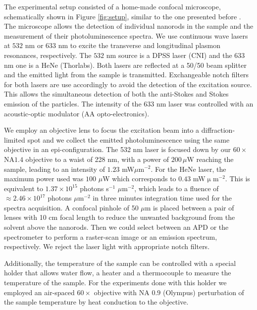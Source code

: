 \documentclass[journal=nalefd,manuscript=letter]{achemso}
\begin{document}
The experimental setup consisted of a home-made confocal microscope, schematically shown in Figure
\ref{fig:setup}, similar to the one presented before \cite{Carattino2016a}. The microscope allows 
the detection of individual nanorods in the sample and the measurement 
of their photoluminescence spectra. 
We use continuous wave lasers at $532$ nm or $633$ nm to excite the transverse 
and longitudinal plasmon resonances, respectively. The  $532$ nm source is a DPSS 
laser (CNI) and the 633 nm one is a HeNe (Thorlabs). Both lasers are reflected at
 a 50/50 beam splitter and the emitted light from the sample is transmitted. 
Exchangeable notch filters for both lasers are use accordingly to avoid the detection 
of the excitation source. This allows the simultaneous detection of both the anti-Stokes
 and Stokes emission of the particles. The intensity of the $633$ nm laser was 
controlled with an acoustic-optic modulator (AA opto-electronics).

We employ an objective lens to focus the excitation beam into a diffraction-limited 
spot and we collect the emitted photoluminescence using the same objective in an epi-configuration. 
The 532 nm laser is focused down by our $60\times$ NA$1.4$ objective to a waist of 228 nm, 
with a power of $200\, \mu$W reaching the sample, leading to an intensity of $1.23$ mW$\mu$m$^{-2}$. 
For the HeNe laser, the maximum power used was $100$ $\mu$W which 
corresponds to $0.43$ mW$\upmu$m$^{-2}$. This is equivalent to $1.37\times10^{15}$ 
photons s$^{-1}$ $\mu$m$^{-2}$, which leads to a fluence of $\approx 2.46\times10^{17}$ photons $\mu$m$^{-2}$ 
in three minutes integration time used for the spectra acquisition. 
A confocal pinhole of 50 $\mu$m is placed between a pair of lenses with 10 cm focal length 
to reduce the unwanted background from the solvent above the nanorods. Then we could 
select between an APD or the spectrometer to perform a raster-scan image or an emission 
spectrum, respectively. We reject the laser light with appropriate notch filters.

Additionally, the temperature of the sample can be controlled with a special holder that allows 
water flow, a heater and a thermocouple to measure the temperature of the sample. 
For the experiments done with this holder we employed an air-spaced $60\times$ 
objective with NA $0.9$ (Olympus) perturbation of the sample temperature by heat 
conduction to the objective.
\end{document}
